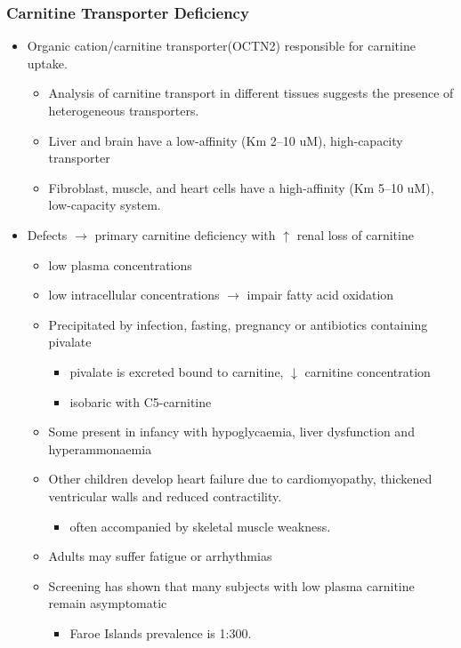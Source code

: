 \documentclass{scrartcl}
\begin{document}
\subsubsection{Carnitine Transporter Deficiency}
\label{sec:org0578bbe}
\begin{itemize}
\item Organic cation/carnitine transporter(OCTN2) responsible for
carnitine uptake. 
\begin{itemize}
\item Analysis of carnitine transport in different tissues suggests the
presence of heterogeneous transporters.
\item Liver and brain have a low-affinity (Km 2–10 uM), high-capacity transporter
\item Fibroblast, muscle, and heart cells have a high-affinity (Km 5–10 uM), low-capacity system.
\end{itemize}
\item Defects \(\to\) primary carnitine deficiency with \(\uparrow\) renal loss of carnitine
\begin{itemize}
\item low plasma concentrations
\item low intracellular concentrations \(\to\) impair fatty acid oxidation
\end{itemize}
\begin{itemize}
\item Precipitated by infection, fasting, pregnancy or antibiotics containing pivalate
\begin{itemize}
\item pivalate is excreted bound to carnitine, \(\downarrow\) carnitine concentration
\item isobaric with C5-carnitine
\end{itemize}
\item Some present in infancy with hypoglycaemia, liver dysfunction and hyperammonaemia
\item Other children develop heart failure due to cardiomyopathy,
thickened ventricular walls and reduced contractility.
\begin{itemize}
\item often accompanied by skeletal muscle weakness.
\end{itemize}
\item Adults may suffer fatigue or arrhythmias
\item Screening has shown that many subjects with low plasma carnitine remain asymptomatic
\begin{itemize}
\item Faroe Islands prevalence is 1:300.
\end{itemize}
\end{itemize}
\end{itemize}
\end{document}
